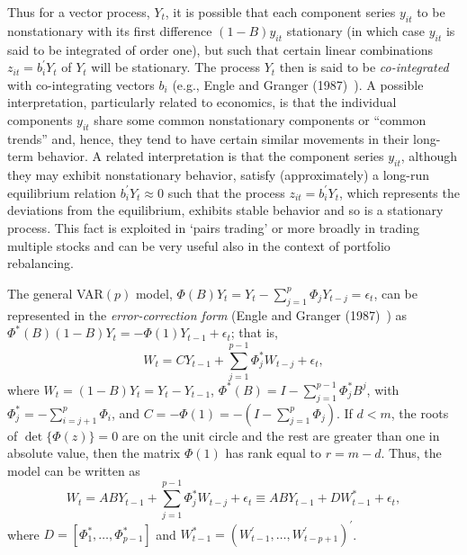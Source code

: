 Thus for a vector process, $Y_t$, it is possible that each component series $y_{it}$ to be nonstationary with its first difference $(1 - B) y_{it}$ stationary (in which case $y_{it}$ is said to be integrated of order one), but such that certain linear combinations $z_{it} = b_i^{\prime} Y_t $ of $Y_t$ will be stationary. The process $Y_t$ then is said to be \textit{co-integrated} with co-integrating vectors $b_i$ (e.g., Engle and Granger (1987)~\cite{engle1987co}).  A possible interpretation, particularly related to economics, is that the individual components $y_{it}$ share some common nonstationary components or ``common trends'' and, hence, they tend to have certain similar movements in their long-term behavior.  A related interpretation is that the component series $y_{it}$, although they may exhibit nonstationary behavior, satisfy (approximately) a long-run equilibrium relation $b_i^{\prime} Y_t \approx 0$ such that the process $z_{it} = b_i^{\prime} Y_t$, which represents the deviations from the equilibrium, exhibits stable behavior and so is a stationary process. This fact is exploited in `pairs trading' or more broadly in trading multiple stocks and can be very useful also in the context of portfolio rebalancing. 


The general VAR$(p)$ model, $\Phi(B) Y_t = Y_t - \sum_{j=1}^p \Phi_j Y_{t-j} = \epsilon_t$, can be represented in the  \textit{error-correction form} (Engle and Granger (1987)~\cite{engle1987co}) as $\Phi^* (B) (1\!-\!B) Y_t = - \Phi (1) Y_{t-1} + \epsilon_t$; that is,
	\begin{equation}\label{eqn:2WtCt}
	W_t = C Y_{t-1} + \sum_{j=1}^{p-1} \Phi_j^* W_{t-j} + \epsilon_t ,
	\end{equation}
where $W_t = (1\!-\!B) Y_t = Y_t - Y_{t-1}$, $\Phi^* (B) = I - \sum_{j=1}^{p-1} \Phi_j^* B^j $, with $\Phi_j^* = - \sum_{i=j+1}^p \Phi_i$, and $C = - \Phi (1) = - (I - \sum_{j=1}^p \Phi_j)$. If $d<m$, the roots of $\det \{ \Phi(z)\}=0$ are on the unit circle and the rest are greater than one in absolute value, then the matrix $\Phi(1)$ has rank equal to $r= m-d$. Thus, the model can be written as
	\begin{equation}\label{eqn:2WtABY}
	W_t = A B Y_{t-1} + \sum_{j=1}^{p-1} \Phi_j^* W_{t-j} + \epsilon_t \equiv
A B Y_{t-1} + D W_{t-1}^* + \epsilon_t , 
	\end{equation}
where $D = [\Phi_1^* ,\ldots,\Phi_{p-1}^* ]$ and $W_{t-1}^* = (W_{t-1}^{\prime}, \ldots, W_{t-p+1}^{\prime} )^{\prime}$.


